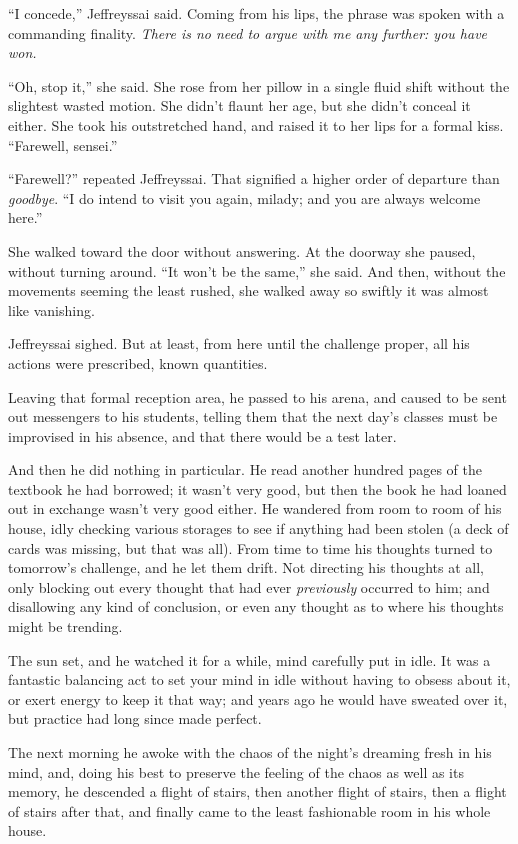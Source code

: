 {
 ``I concede,'' Jeffreyssai
said. Coming from his lips, the phrase was spoken with a commanding
finality. \textit{There is no need to argue with me any further: you
have won.}}

{
 ``Oh, stop it,'' she said. She
rose from her pillow in a single fluid shift without the slightest
wasted motion. She didn't flaunt her age, but she
didn't conceal it either. She took his outstretched
hand, and raised it to her lips for a formal kiss.
``Farewell, sensei.''}

{
 ``Farewell?'' repeated
Jeffreyssai. That signified a higher order of departure than
\textit{goodbye}. ``I do intend to visit you again,
milady; and you are always welcome here.''}

{
 She walked toward the door without answering. At the doorway she
paused, without turning around. ``It
won't be the same,'' she said. And
then, without the movements seeming the least rushed, she walked away
so swiftly it was almost like vanishing.}

{
 Jeffreyssai sighed. But at least, from here until the challenge
proper, all his actions were prescribed, known quantities.}

{
 Leaving that formal reception area, he passed to his arena, and
caused to be sent out messengers to his students, telling them that the
next day's classes must be improvised in his absence,
and that there would be a test later.}

{
 And then he did nothing in particular. He read another hundred
pages of the textbook he had borrowed; it wasn't very
good, but then the book he had loaned out in exchange
wasn't very good either. He wandered from room to room
of his house, idly checking various storages to see if anything had
been stolen (a deck of cards was missing, but that was all). From time
to time his thoughts turned to tomorrow's challenge,
and he let them drift. Not directing his thoughts at all, only blocking
out every thought that had ever \textit{previously} occurred to him;
and disallowing any kind of conclusion, or even any thought as to where
his thoughts might be trending.}

{
 The sun set, and he watched it for a while, mind carefully put in
idle. It was a fantastic balancing act to set your mind in idle without
having to obsess about it, or exert energy to keep it that way; and
years ago he would have sweated over it, but practice had long since
made perfect.}

{
 The next morning he awoke with the chaos of the
night's dreaming fresh in his mind, and, doing his best
to preserve the feeling of the chaos as well as its memory, he
descended a flight of stairs, then another flight of stairs, then a
flight of stairs after that, and finally came to the least fashionable
room in his whole house.}


